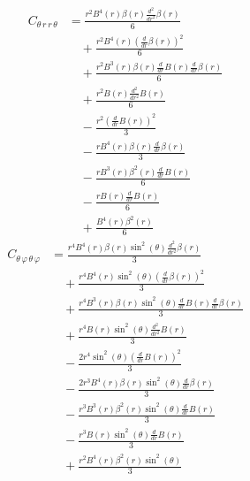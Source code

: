 \documentclass[11pt,a4paper]{article}
\begin{document}
\begin{align*}
  C_{\theta\,r\,r\,\theta} &= \frac{r^{2} B^{4}{\left(r \right)} \beta{\left(r \right)} \frac{d^{2}}{d r^{2}} \beta{\left(r \right)}}{6} \\
  &\quad + \frac{r^{2} B^{4}{\left(r \right)} \left(\frac{d}{d r} \beta{\left(r \right)}\right)^{2}}{6} \\
  &\quad + \frac{r^{2} B^{3}{\left(r \right)} \beta{\left(r \right)} \frac{d}{d r} B{\left(r \right)} \frac{d}{d r} \beta{\left(r \right)}}{6} \\
  &\quad + \frac{r^{2} B{\left(r \right)} \frac{d^{2}}{d r^{2}} B{\left(r \right)}}{6} \\
  &\quad - \frac{r^{2} \left(\frac{d}{d r} B{\left(r \right)}\right)^{2}}{3} \\
  &\quad - \frac{r B^{4}{\left(r \right)} \beta{\left(r \right)} \frac{d}{d r} \beta{\left(r \right)}}{3} \\
  &\quad - \frac{r B^{3}{\left(r \right)} \beta^{2}{\left(r \right)} \frac{d}{d r} B{\left(r \right)}}{6} \\
  &\quad - \frac{r B{\left(r \right)} \frac{d}{d r} B{\left(r \right)}}{6} \\
  &\quad + \frac{B^{4}{\left(r \right)} \beta^{2}{\left(r \right)}}{6}
\end{align*}
\begin{align*}
  C_{\theta\,\varphi\,\theta\,\varphi} &= \frac{r^{4} B^{4}{\left(r \right)} \beta{\left(r \right)} \sin^{2}{\left(\theta \right)} \frac{d^{2}}{d r^{2}} \beta{\left(r \right)}}{3} \\
  &\quad + \frac{r^{4} B^{4}{\left(r \right)} \sin^{2}{\left(\theta \right)} \left(\frac{d}{d r} \beta{\left(r \right)}\right)^{2}}{3} \\
  &\quad + \frac{r^{4} B^{3}{\left(r \right)} \beta{\left(r \right)} \sin^{2}{\left(\theta \right)} \frac{d}{d r} B{\left(r \right)} \frac{d}{d r} \beta{\left(r \right)}}{3} \\
  &\quad + \frac{r^{4} B{\left(r \right)} \sin^{2}{\left(\theta \right)} \frac{d^{2}}{d r^{2}} B{\left(r \right)}}{3} \\
  &\quad - \frac{2 r^{4} \sin^{2}{\left(\theta \right)} \left(\frac{d}{d r} B{\left(r \right)}\right)^{2}}{3} \\
  &\quad - \frac{2 r^{3} B^{4}{\left(r \right)} \beta{\left(r \right)} \sin^{2}{\left(\theta \right)} \frac{d}{d r} \beta{\left(r \right)}}{3} \\
  &\quad - \frac{r^{3} B^{3}{\left(r \right)} \beta^{2}{\left(r \right)} \sin^{2}{\left(\theta \right)} \frac{d}{d r} B{\left(r \right)}}{3} \\
  &\quad - \frac{r^{3} B{\left(r \right)} \sin^{2}{\left(\theta \right)} \frac{d}{d r} B{\left(r \right)}}{3} \\
  &\quad + \frac{r^{2} B^{4}{\left(r \right)} \beta^{2}{\left(r \right)} \sin^{2}{\left(\theta \right)}}{3}
\end{align*}
\end{document}
